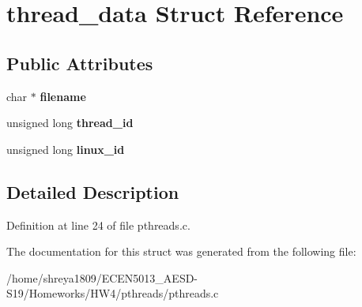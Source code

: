 \hypertarget{structthread__data}{}\section{thread\+\_\+data Struct Reference}
\label{structthread__data}
\subsection*{Public Attributes}
\begin{DoxyCompactItemize}
\item 
\mbox{\label{structthread__data_a66b269197cb0c8b0a2af2094f9fb400b}} 
char $\ast$ {\bfseries filename}
\item 
\mbox{\label{structthread__data_a3711fe61f4229a38fab24e7acba3756b}} 
unsigned long {\bfseries thread\+\_\+id}
\item 
\mbox{\label{structthread__data_a17a0e0c53ac893498e261345b2f150e5}} 
unsigned long {\bfseries linux\+\_\+id}
\end{DoxyCompactItemize}


\subsection{Detailed Description}


Definition at line 24 of file pthreads.\+c.



The documentation for this struct was generated from the following file\+:\begin{DoxyCompactItemize}
\item 
/home/shreya1809/\+E\+C\+E\+N5013\+\_\+\+A\+E\+S\+D-\/\+S19/\+Homeworks/\+H\+W4/pthreads/pthreads.\+c\end{DoxyCompactItemize}
